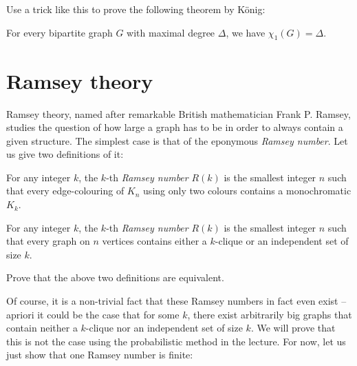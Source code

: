 \documentclass[nobib]{tufte-handout}
\begin{document}
\begin{xca}
    Use a trick like this to prove the following theorem by König:

    \begin{theorem}[König, 1916]
        For every bipartite graph $G$ with maximal degree $\Delta$, we have $\chi_1(G) = \Delta$.
    \end{theorem}
\end{xca}

\section{Ramsey theory}

Ramsey theory, named after remarkable British mathematician Frank P. Ramsey, studies the question of how large a graph has to be in order to always contain a given structure. The simplest case is that of the eponymous \emph{Ramsey number}. Let us give two definitions of it:

\begin{definition}
    For any integer $k$, the $k$-th \emph{Ramsey number} $R(k)$ is the smallest integer $n$ such that every edge-colouring of $K_n$ using only two colours contains a monochromatic $K_k$.
\end{definition}

\begin{definition}
    For any integer $k$, the $k$-th \emph{Ramsey number} $R(k)$ is the smallest integer $n$ such that every graph on $n$ vertices contains either a $k$-clique or an independent set of size $k$.
\end{definition}

\begin{xca}
    Prove that the above two definitions are equivalent.
\end{xca}

Of course, it is a non-trivial fact that these Ramsey numbers in fact even exist -- apriori it could be the case that for some $k$, there exist arbitrarily big graphs that contain neither a $k$-clique nor an independent set of size $k$. We will prove that this is not the case using the probabilistic method in the lecture. For now, let us just show that one Ramsey number is finite:
\end{document}
